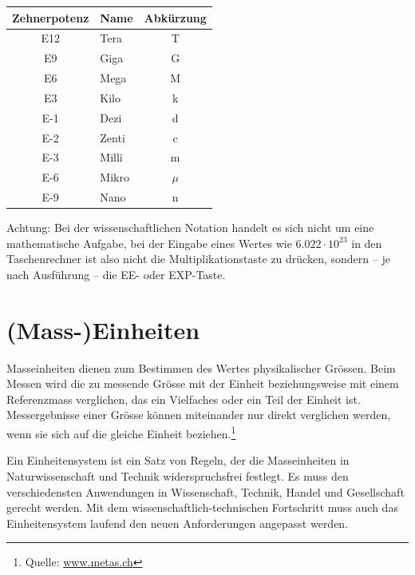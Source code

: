 \begin{margintable}
\begin{tabular}{clc}
\hline
Zehnerpotenz & Name & Abkürzung \\
\midrule
\SI{E12}{} & Tera & T \\
\SI{E9}{} & Giga & G \\
\SI{E6}{} & Mega & M \\
\SI{E3}{} & Kilo & k \\
\SI{E-1}{} & Dezi & d \\
\SI{E-2}{} & Zenti & c \\
\SI{E-3}{} & Milli & m \\
\SI{E-6}{} & Mikro & $\mu$ \\
\SI{E-9}{} & Nano & n \\
\bottomrule
\end{tabular}
\end{margintable}

Achtung: Bei der wissenschaftlichen Notation handelt es sich nicht um eine mathematische Aufgabe, bei der Eingabe eines Wertes wie $6.022 \cdot 10^{23}$ in den Taschenrechner ist also nicht die Multiplikationstaste zu drücken, sondern – je nach Ausführung – die EE- oder EXP-Taste.

\section{(Mass-)Einheiten}
Masseinheiten dienen zum Bestimmen des Wertes physikalischer Grössen. Beim Messen wird die zu messende Grösse mit der Einheit beziehungsweise mit einem Referenzmass 
verglichen, das ein Vielfaches oder ein Teil der Einheit ist. 
Messergebnisse einer Grösse können miteinander nur direkt verglichen werden, wenn sie sich auf die gleiche Einheit beziehen.\footnote{Quelle: \href{http://www.metas.ch}{www.metas.ch}}

Ein Einheitensystem ist ein Satz von Regeln, der die Masseinheiten in Naturwissenschaft und Technik widerspruchsfrei festlegt. Es muss den verschiedensten Anwendungen in 
Wissenschaft, Technik, Handel und Gesellschaft gerecht werden. 
Mit dem wissenschaftlich-technischen Fortschritt muss auch das 
Einheitensystem laufend den neuen Anforderungen angepasst 
werden. 

